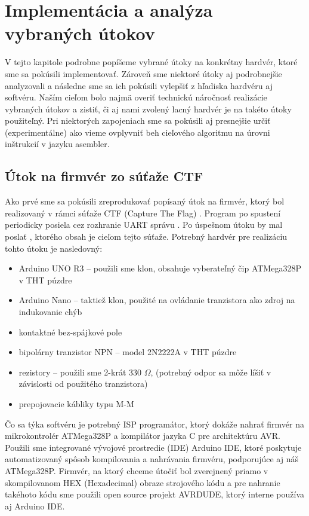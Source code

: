 \chapter{Implementácia a analýza vybraných útokov}

\label{kap:utoky}

V tejto kapitole podrobne popíšeme vybrané útoky na konkrétny hardvér, ktoré sme sa pokúsili implementovať. Zároveň sme niektoré útoky aj podrobnejšie analyzovali a následne sme sa ich pokúsili vylepšiť z hľadiska hardvéru aj softvéru. Naším cieľom bolo najmä overiť technickú náročnosť realizácie vybraných útokov a zistiť, či aj nami zvolený lacný hardvér je na takéto útoky použiteľný. Pri niektorých zapojeniach sme sa pokúsili aj presnejšie určiť (experimentálne) ako vieme ovplyvniť beh cieľového algoritmu na úrovni inštrukcií v jazyku asembler.

\section{Útok na firmvér zo súťaže CTF}
Ako prvé sme sa pokúsili zreprodukovať popísaný útok na firmvér, ktorý bol realizovaný v rámci súťaže CTF (Capture The Flag) \cite{vccOnTheCheap}. Program po spustení periodicky posiela cez rozhranie UART správu . Po úspešnom útoku by mal poslať , ktorého obsah je cieľom tejto súťaže. Potrebný hardvér pre realizáciu tohto útoku je nasledovný:
\begin{itemize}
    \item Arduino UNO R3 -- použili sme klon, obsahuje vyberateľný čip ATMega328P v THT púzdre
    \item Arduino Nano -- taktiež klon, použité na ovládanie tranzistora ako zdroj na indukovanie chýb
    \item kontaktné bez-spájkové pole
    \item bipolárny tranzistor NPN -- model 2N2222A v THT púzdre
    \item rezistory -- použili sme 2-krát 330 $\Omega$, (potrebný odpor sa môže líšiť v závislosti od použitého tranzistora)
    \item prepojovacie kábliky typu M-M
\end{itemize}
Čo sa týka softvéru je potrebný ISP programátor, ktorý dokáže nahrať firmvér na mikrokontrolér ATMega328P a kompilátor jazyka C pre architektúru AVR. Použili sme integrované vývojové prostredie (IDE) Arduino IDE, ktoré poskytuje automatizovaný spôsob kompilovania a nahrávania firmvéru, podporujúce aj náš ATMega328P. Firmvér, na ktorý chceme útočiť bol zverejnený priamo v skompilovanom HEX (Hexadecimal) obraze strojového kódu a pre nahranie takéhoto kódu sme použili open source projekt AVRDUDE, ktorý interne používa aj Arduino IDE.

